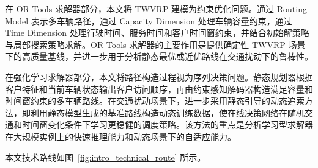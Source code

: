 \documentclass[12pt,a4paper,UTF8]{article}
\begin{document}
在 OR-Tools 求解器部分，本文将 TWVRP 建模为约束优化问题。通过 Routing Model 表示多车辆路径，通过 Capacity Dimension 处理车辆容量约束，通过 Time Dimension 处理行驶时间、服务时间和客户时间窗约束，并结合初始解策略与局部搜索策略求解。OR-Tools 求解器的主要作用是提供确定性 TWVRP 场景下的高质量基线，并进一步用于分析静态最优或近优路线在交通扰动下的鲁棒性。

在强化学习求解器部分，本文将路径构造过程视为序列决策问题。静态规划器根据客户特征和当前车辆状态输出客户访问顺序，再由约束感知解码器构造满足容量和时间窗约束的多车辆路线。在交通扰动场景下，进一步采用静态引导的动态追索方法，即利用静态模型生成的基准路线构造动态训练数据，使在线决策网络在随机交通和时间窗变化条件下学习更稳健的调度策略。该方法的重点是分析学习型求解器在大规模实例上的快速推理能力和动态场景下的自适应能力。

本文技术路线如图~\ref{fig:intro_technical_route} 所示。
\end{document}
